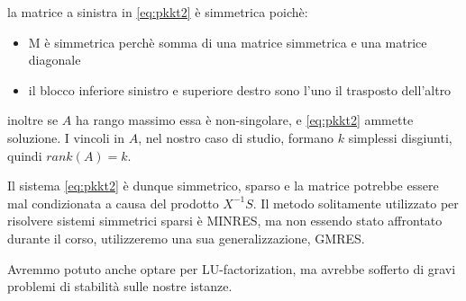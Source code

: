 la matrice a sinistra in \ref{eq:pkkt2} è simmetrica poichè:
\begin{itemize}
    \item M è simmetrica perchè somma di una matrice simmetrica e una matrice diagonale
    \item il blocco inferiore sinistro e superiore destro sono l'uno il trasposto dell'altro
\end{itemize}
inoltre se $A$ ha rango massimo essa è non-singolare, e \ref{eq:pkkt2} ammette soluzione. I vincoli in $A$, nel nostro caso di studio, formano $k$ simplessi disgiunti, quindi $rank(A)=k$.


Il sistema \ref{eq:pkkt2} è dunque simmetrico, sparso e la matrice potrebbe essere mal condizionata a causa del prodotto $X^{-1}S$. Il metodo solitamente 
utilizzato per risolvere sistemi simmetrici sparsi è MINRES, ma non essendo stato affrontato durante il corso, utilizzeremo una sua generalizzazione, GMRES.

Avremmo potuto anche optare per LU-factorization, ma avrebbe sofferto di gravi problemi di stabilità sulle nostre istanze.